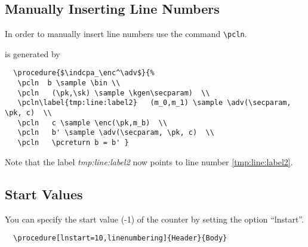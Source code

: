 \documentclass[a4paper]{report}
\begin{document}
  \subsection{Manually Inserting Line Numbers}
  In order to manually insert line numbers use the command \lstinline$\pcln$.
  \begin{center}
  \end{center}
  is generated by 
  \begin{lstlisting}
  \procedure{$\indcpa_\enc^\adv$}{%
   \pcln  b \sample \bin \\
   \pcln   (\pk,\sk) \sample \kgen\secparam)  \\
   \pcln\label{tmp:line:label2}   (m_0,m_1) \sample \adv(\secparam, \pk, c)  \\
   \pcln   c \sample \enc(\pk,m_b)  \\
   \pcln   b' \sample \adv(\secparam, \pk, c)  \\
   \pcln   \pcreturn b = b' }
  \end{lstlisting}
  Note that the label \emph{tmp:line:label2} now points to line number \ref{tmp:line:label2}.
  
  
  
  \subsection{Start Values}
  You can specify the start value (-1) of the counter by setting the option \enquote{lnstart}.
  \begin{lstlisting}
  \procedure[lnstart=10,linenumbering]{Header}{Body}
  \end{lstlisting}
  \begin{center}
  \end{center}
  
\end{document}
